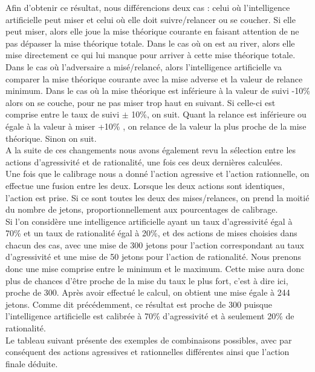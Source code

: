 \documentclass{report}
\begin{document}
Afin d'obtenir ce résultat, nous différencions deux cas : celui où l'intelligence artificielle peut miser et celui où elle doit suivre/relancer ou se coucher. Si elle peut miser, alors elle joue la mise théorique courante en faisant attention de ne pas dépasser la mise théorique totale. Dans le cas où on est au river, alors elle mise directement ce qui lui manque pour arriver à cette mise théorique totale.\\

Dans le cas où l'adversaire a misé/relancé, alors l'intelligence artificielle va comparer la mise théorique courante avec la mise adverse et la valeur de relance minimum. Dans le cas où la mise théorique est inférieure à la valeur de suivi -10\% alors on se couche, pour ne  pas miser trop haut en suivant. Si celle-ci est comprise entre le taux de suivi $\pm$ 10\%, on suit.
Quant la relance est inférieure ou égale à la valeur à miser +10\% , on relance de la valeur la plus proche de la mise théorique. Sinon on suit.\\


A la suite de ces changements nous avons également revu la sélection entre les actions d'agressivité et de rationalité, une fois ces deux dernières calculées.\\

Une fois que le calibrage nous a donné l'action agressive et l'action rationnelle, on effectue une fusion entre les deux. Lorsque les deux actions sont identiques, l'action est prise. Si ce sont toutes les deux des mises/relances, on prend la moitié du nombre de jetons, proportionnellement aux pourcentages de calibrage.\\

Si l'on considère une intelligence artificielle ayant un taux d'agressivité égal à  70\% et un taux de rationalité égal à 20\%, et des actions de mises choisies dans chacun des cas, avec une mise de 300 jetons pour l'action correspondant au taux d'agressivité et une mise de 50 jetons pour l'action de rationalité. Nous prenons donc une mise comprise entre le minimum et le maximum. Cette mise aura donc plus de chances d'être proche de la mise du taux le plus fort, c'est à dire ici, proche de 300. Après avoir effectué le calcul, on obtient une mise égale à 244 jetons. Comme dit précédemment, ce résultat est proche de 300 puisque l'intelligence artificielle est calibrée à 70\% d'agressivité et à seulement 20\% de rationalité.\\

Le tableau suivant présente des exemples de combinaisons possibles, avec par conséquent des actions agressives et rationnelles différentes ainsi que l'action finale déduite.\\
\end{document}
